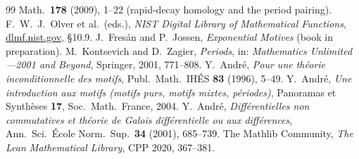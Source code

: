 \documentclass[11pt,reqno]{amsart}
\theoremstyle{plain}
\theoremstyle{definition}
\theoremstyle{remark}
\begin{document}
\begin{thebibliography}{99}
Math.\ \textbf{178} (2009), 1--22 (rapid-decay homology and the period pairing).
 F.~W.~J.~Olver et al.\ (eds.), \emph{NIST Digital Library of
Mathematical Functions}, \href{https://dlmf.nist.gov/}{dlmf.nist.gov}, \S10.9.
 J.~Fres\'an and P.~Jossen, \emph{Exponential Motives}
(book in preparation).
 M.~Kontsevich and D.~Zagier, \emph{Periods}, in: \emph{Mathematics
Unlimited---2001 and Beyond}, Springer, 2001, 771--808.
 Y.~Andr\'e, \emph{Pour une th\'eorie inconditionnelle des
motifs}, Publ.\ Math.\ IH\'ES \textbf{83} (1996), 5--49.
 Y.~Andr\'e, \emph{Une introduction aux motifs (motifs
purs, motifs mixtes, p\'eriodes)}, Panoramas et Synth\`eses \textbf{17}, Soc.\
Math.\ France, 2004.
 Y.~Andr\'e, \emph{Diff\'erentielles non commutatives et
th\'eorie de Galois diff\'erentielle ou aux diff\'erences}, Ann.\ Sci.\ \'Ecole
Norm.\ Sup.\ \textbf{34} (2001), 685--739.
 The Mathlib Community, \emph{The Lean Mathematical Library},
CPP 2020, 367--381.
\end{thebibliography}
\end{document}
